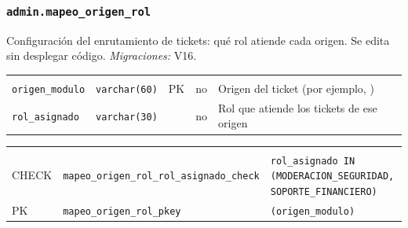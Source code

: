 \subsubsection{\texorpdfstring{\texttt{admin.mapeo\_\allowbreak{}origen\_\allowbreak{}rol}}{admin.mapeo\_origen\_rol}}\label{dd:admin.mapeo_origen_rol}

Configuración del enrutamiento de tickets: qué rol atiende cada origen. Se edita sin desplegar código. \emph{Migraciones:} V16.

{\small
\begin{xltabular}{\textwidth}{@{}>{\raggedright\arraybackslash}p{3.6cm} >{\raggedright\arraybackslash}p{2.3cm} >{\raggedright\arraybackslash}p{1cm} >{\centering\arraybackslash}p{0.85cm} L@{}}
    \toprule
     &  &  &  &  \\
    \midrule
    \endfirsthead
    \toprule
     &  &  &  &  \\
    \midrule
    \endhead
    \bottomrule
    \endfoot
    \texttt{origen\_\allowbreak{}modulo} & \texttt{varchar(\allowbreak{}60)} & PK & no & Origen del ticket (por ejemplo, ) \\
    \texttt{rol\_\allowbreak{}asignado} & \texttt{varchar(\allowbreak{}30)} &  & no & Rol que atiende los tickets de ese origen \\
\end{xltabular}
}

{\small
\begin{xltabular}{\textwidth}{@{}>{\raggedright\arraybackslash}p{1.7cm} >{\raggedright\arraybackslash}p{4.6cm} L@{}}
    \toprule
     &  &  \\
    \midrule
    \endfirsthead
    \toprule
     &  &  \\
    \midrule
    \endhead
    \bottomrule
    \endfoot
    CHECK & \texttt{mapeo\_\allowbreak{}origen\_\allowbreak{}rol\_\allowbreak{}rol\_\allowbreak{}asignado\_\allowbreak{}check} & \texttt{rol\_\allowbreak{}asignado IN (\allowbreak{}\textquotesingle{}MODERACION\_\allowbreak{}SEGURIDAD\textquotesingle{},\allowbreak{} \textquotesingle{}SOPORTE\_\allowbreak{}FINANCIERO\textquotesingle{})} \\
    PK & \texttt{mapeo\_\allowbreak{}origen\_\allowbreak{}rol\_\allowbreak{}pkey} & \texttt{(\allowbreak{}origen\_\allowbreak{}modulo)} \\
\end{xltabular}
}

